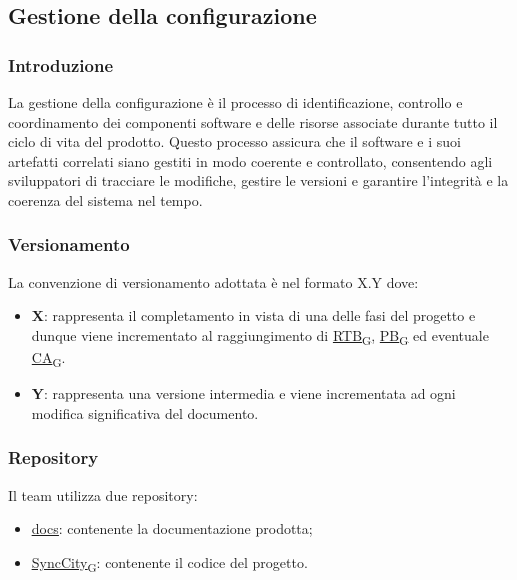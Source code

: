 \subsection{Gestione della configurazione}
\subsubsection{Introduzione}
La gestione della configurazione è il processo di identificazione, controllo e coordinamento dei componenti software e delle risorse associate durante tutto il ciclo di vita del prodotto. Questo processo assicura che il software e i suoi artefatti correlati siano gestiti in modo coerente e controllato, consentendo agli sviluppatori di tracciare le modifiche, gestire le versioni e garantire l'integrità e la coerenza del sistema nel tempo.
\newpage
\subsubsection{Versionamento}
La convenzione di versionamento adottata è nel formato X.Y dove:
\begin{itemize}
	\item \textbf{X}: rappresenta il completamento in vista di una delle fasi del progetto e dunque viene incrementato al raggiungimento di \href{https://7last.github.io/docs/rtb/documentazione-interna/glossario\#requirements-and-technology-baseline}{RTB\textsubscript{G}}, \href{https://7last.github.io/docs/rtb/documentazione-interna/glossario\#product-baseline}{PB\textsubscript{G}} ed eventuale \href{https://7last.github.io/docs/rtb/documentazione-interna/glossario\#customer-acceptance}{CA\textsubscript{G}}.
	\item \textbf{Y}: rappresenta una versione intermedia e viene incrementata ad ogni modifica significativa del documento.
\end{itemize}

\subsubsection{Repository}
Il team utilizza due repository:
\begin{itemize}
	\item \href{https://github.com/7Last/docs.git}{\underline{docs}}: contenente la documentazione prodotta;
	\item \href{https://github.com/7Last/SyncCity}{\href{https://7last.github.io/docs/rtb/documentazione-interna/glossario\#synccity}{\underline{SyncCity}\textsubscript{G}}}: contenente il codice del progetto.
\end{itemize}

